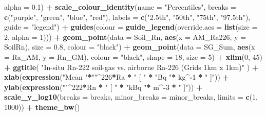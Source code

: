 \documentclass[
  12pt,
]{article}
\newenvironment{Shaded}{\begin{snugshade}}{\end{snugshade}}
\newcommand{\DataTypeTok}[1]{\textcolor[rgb]{0.13,0.29,0.53}{#1}}
\newcommand{\DecValTok}[1]{\textcolor[rgb]{0.00,0.00,0.81}{#1}}
\newcommand{\FloatTok}[1]{\textcolor[rgb]{0.00,0.00,0.81}{#1}}
\newcommand{\KeywordTok}[1]{\textcolor[rgb]{0.13,0.29,0.53}{\textbf{#1}}}
\newcommand{\NormalTok}[1]{#1}
\newcommand{\OperatorTok}[1]{\textcolor[rgb]{0.81,0.36,0.00}{\textbf{#1}}}
\newcommand{\StringTok}[1]{\textcolor[rgb]{0.31,0.60,0.02}{#1}}
\begin{document}
\begin{Shaded}
\begin{Highlighting}[]
             \DataTypeTok{alpha =} \FloatTok{0.1}\NormalTok{) }\OperatorTok{+}
\StringTok{  }\KeywordTok{scale\_colour\_identity}\NormalTok{(}\DataTypeTok{name =} \StringTok{"Percentiles"}\NormalTok{,}
                       \DataTypeTok{breaks =} \KeywordTok{c}\NormalTok{(}\StringTok{"purple"}\NormalTok{, }\StringTok{"green"}\NormalTok{, }\StringTok{"blue"}\NormalTok{, }\StringTok{"red"}\NormalTok{),}
                       \DataTypeTok{labels =} \KeywordTok{c}\NormalTok{(}\StringTok{"2.5th"}\NormalTok{, }\StringTok{"50th"}\NormalTok{, }\StringTok{"75th"}\NormalTok{, }\StringTok{"97.5th"}\NormalTok{),}
                       \DataTypeTok{guide =} \StringTok{"legend"}\NormalTok{) }\OperatorTok{+}
\StringTok{  }\KeywordTok{guides}\NormalTok{(}\DataTypeTok{colour =} \KeywordTok{guide\_legend}\NormalTok{(}\DataTypeTok{override.aes =} \KeywordTok{list}\NormalTok{(}\DataTypeTok{size =} \DecValTok{2}\NormalTok{, }\DataTypeTok{alpha =} \DecValTok{1}\NormalTok{))) }\OperatorTok{+}
\StringTok{  }\KeywordTok{geom\_point}\NormalTok{(}\DataTypeTok{data =}\NormalTok{ Soil\_Rn, }\KeywordTok{aes}\NormalTok{(}\DataTypeTok{x =}\NormalTok{ AM\_Ra226, }\DataTypeTok{y =}\NormalTok{ SoilRn),}
             \DataTypeTok{size =} \FloatTok{0.8}\NormalTok{,}
             \DataTypeTok{colour =} \StringTok{"black"}\NormalTok{) }\OperatorTok{+}
\StringTok{  }\KeywordTok{geom\_point}\NormalTok{(}\DataTypeTok{data =}\NormalTok{ SG\_Sum, }\KeywordTok{aes}\NormalTok{(}\DataTypeTok{x =}\NormalTok{ Ra\_AM, }\DataTypeTok{y =}\NormalTok{ Rn\_GM),}
             \DataTypeTok{colour =} \StringTok{"black"}\NormalTok{,}
             \DataTypeTok{shape =} \DecValTok{18}\NormalTok{,}
             \DataTypeTok{size =} \DecValTok{5}\NormalTok{) }\OperatorTok{+}\StringTok{ }
\StringTok{  }\KeywordTok{xlim}\NormalTok{(}\DecValTok{0}\NormalTok{, }\DecValTok{45}\NormalTok{) }\OperatorTok{+}
\StringTok{  }\KeywordTok{ggtitle}\NormalTok{(}
    \StringTok{"In{-}situ Rn{-}222 soil{-}gas vs. airborne Ra{-}226 (Grids 1km x 1km)"}
\NormalTok{  ) }\OperatorTok{+}\StringTok{ }
\StringTok{  }\KeywordTok{xlab}\NormalTok{(}\KeywordTok{expression}\NormalTok{(}\StringTok{"Mean "}\OperatorTok{*}\StringTok{""}\OperatorTok{\^{}}\DecValTok{226}\OperatorTok{*}\NormalTok{Ra }\OperatorTok{*}\StringTok{ " [ "} \OperatorTok{*}\StringTok{ "Bq "}\OperatorTok{*}\StringTok{ }\NormalTok{kg}\OperatorTok{\^{}{-}}\DecValTok{1} \OperatorTok{*}\StringTok{ " ]"}\NormalTok{)) }\OperatorTok{+}\StringTok{ }
\StringTok{  }\KeywordTok{ylab}\NormalTok{(}\KeywordTok{expression}\NormalTok{(}\StringTok{""}\OperatorTok{\^{}}\DecValTok{222}\OperatorTok{*}\NormalTok{Rn }\OperatorTok{*}\StringTok{ " [ "} \OperatorTok{*}\StringTok{ "kBq "}\OperatorTok{*}\StringTok{ }\NormalTok{m}\OperatorTok{\^{}{-}}\DecValTok{3} \OperatorTok{*}\StringTok{ " ]"}\NormalTok{)) }\OperatorTok{+}
\StringTok{  }\KeywordTok{scale\_y\_log10}\NormalTok{(}\DataTypeTok{breaks =}\NormalTok{ breaks,}
                \DataTypeTok{minor\_breaks =}\NormalTok{ minor\_breaks,}
                \DataTypeTok{limits =} \KeywordTok{c}\NormalTok{(}\DecValTok{1}\NormalTok{, }\DecValTok{1000}\NormalTok{)) }\OperatorTok{+}
\StringTok{  }\KeywordTok{theme\_bw}\NormalTok{()}


\end{Highlighting}
\end{Shaded}
\end{document}
